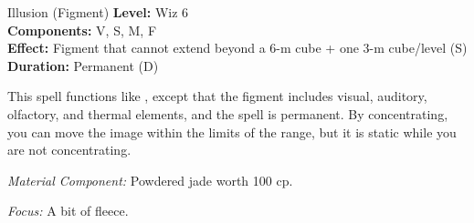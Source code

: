 {Illusion (Figment)}
{
	\textbf{Level:}
	Wiz 6\\
	\textbf{Components:}
	V, S, M, F\\
	\textbf{Effect:}
	Figment that cannot extend beyond a 6-m cube + one 3-m cube/level (S)\\
	\textbf{Duration:}
	Permanent (D)\\
}
{
	This spell functions like , except that the figment includes visual, auditory, olfactory, and thermal elements, and the spell is permanent. By concentrating, you can move the image within the limits of the range, but it is static while you are not concentrating.

	\textit{Material Component:}
	 Powdered jade worth 100 cp.

	\textit{Focus:}
	A bit of fleece.

}
